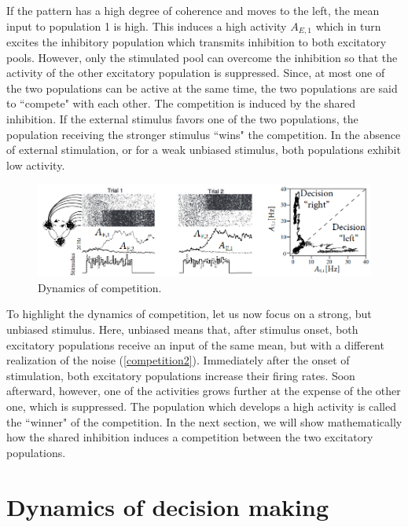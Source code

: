 \documentclass[12pt,hyperref,a4paper,UTF8]{ctexart}
\begin{document}
If the pattern has a high degree of coherence and moves to the left, the mean input to population 1 is high. This induces a high activity $A_{E,1}$ which in turn excites the inhibitory population which transmits inhibition to both excitatory pools. However, only the stimulated pool can overcome the inhibition so that the activity of the other excitatory population is suppressed. Since, at most one of the two populations can be active at the same time, the two populations are said to ``compete" with each other. The competition is induced by the shared inhibition. If the external stimulus favors one of the two populations, the population receiving the stronger stimulus ``wins" the competition. In the absence of external stimulation, or for a weak unbiased stimulus, both populations exhibit low activity.

\begin{figure}[h]
    \begin{center}
    \includegraphics[width=\textwidth]{competition2.png}
    \caption{Dynamics of competition.}
    \label{competition2}
    \end{center}
\end{figure}

To highlight the dynamics of competition, let us now focus on a strong, but unbiased stimulus. Here, unbiased means that, after stimulus onset, both excitatory populations receive an input of the same mean, but with a different realization of the noise (\autoref{competition2}). Immediately after the onset of stimulation, both excitatory populations increase their firing rates. Soon afterward, however, one of the activities grows further at the expense of the other one, which is suppressed. The population which develops a high activity is called the ``winner" of the competition. In the next section, we will show mathematically how the shared inhibition induces a competition between the two excitatory populations.

\section{Dynamics of decision making}
\end{document}
